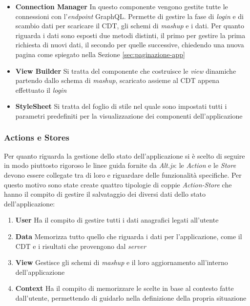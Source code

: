 \begin{itemize}
	\item \textbf{Connection Manager}
	In questo componente vengono gestite tutte le connessioni con l'\emph{endpoint} GraphQL. Permette di gestire la fase di \emph{login} e di scambio dati per scaricare il CDT, gli schemi di \emph{mashup} e i dati. Per quanto riguarda i dati sono esposti due metodi distinti, il primo per gestire la prima richiesta di nuovi dati, il secondo per quelle successive, chiedendo una nuova pagina come spiegato nella Sezione \ref{sec:paginazione-app}
	\item \textbf{View Builder}
	Si tratta del componente che costruisce le \emph{view} dinamiche partendo dallo schema di \emph{mashup}, scaricato assieme al CDT appena effettuato il \emph{login}	
	\item \textbf{StyleSheet}
	Si tratta del foglio di stile nel quale sono impostati tutti i parametri predefiniti per la visualizzazione dei componenti dell'applicazione
\end{itemize}

\subsubsection{Actions e Stores\label{sec:action-store}}
Per quanto riguarda la gestione dello stato dell'applicazione si è scelto di seguire in modo piuttosto rigoroso le linee guida fornite da \emph{Alt.js}: le \emph{Action} e le \emph{Store} devono essere collegate tra di loro e riguardare delle funzionalità specifiche.
Per questo motivo sono state create quattro tipologie di coppie \emph{Action-Store} che hanno il compito di gestire il salvataggio dei diversi dati dello stato dell'applicazione: 
\begin{enumerate}
	\item \textbf{User} Ha il compito di gestire tutti i dati anagrafici legati all'utente
	\item \textbf{Data} Memorizza tutto quello che riguarda i dati per l'applicazione, come il CDT e i risultati che provengono dal \emph{server}
	\item \textbf{View} Gestisce gli schemi di \emph{mashup} e il loro aggiornamento all'interno dell'ap\-pli\-ca\-zio\-ne
	\item \textbf{Context} Ha il compito di memorizzare le scelte in base al contesto fatte dall'utente, permettendo di guidarlo nella definizione della propria situazione
\end{enumerate}

